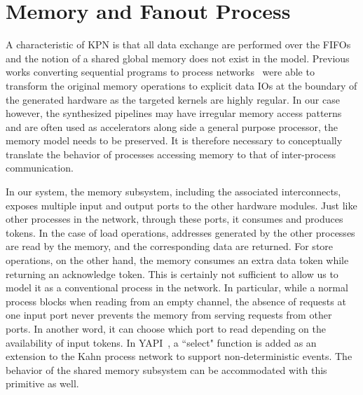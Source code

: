 \section{Memory and Fanout Process}
\label{mp}
A characteristic
of KPN is that all data exchange are performed over the FIFOs and the notion of
a shared global memory does not exist in the model. Previous works
converting sequential programs to process networks~\cite{mat2pn}\cite{c2stream}
were able to transform the original memory operations to explicit data IOs
at the boundary of the generated hardware as the targeted kernels are highly 
regular. In our case however, the synthesized pipelines may have irregular memory access patterns and are often used as accelerators along side a general purpose processor, the memory model needs to be preserved. It is therefore necessary to conceptually
translate the behavior of processes accessing memory to that of inter-process
communication.


In our system, the memory subsystem, including the associated interconnects, exposes multiple
input and output ports to the other hardware modules. 
Just like other processes in the network, through these ports, it consumes and produces tokens. In the case of load operations, addresses generated by the other processes
are read by the memory, and the corresponding data are returned. For store operations, on the other hand, the memory
consumes an extra data token while returning an acknowledge token.
This is certainly not sufficient to allow us to model it as
a conventional process in the network.
In particular, while a normal process blocks when reading from an empty
channel, the absence of requests at one input port never prevents the memory from serving requests from other ports. In another word, it can choose
which port to read depending on the availability of input tokens.
In YAPI~\cite{deKock:2000:YAM:337292.337511}, a ``select" function is added as an extension to the Kahn process network to support non-deterministic events. The behavior of
the shared memory subsystem can be accommodated with this primitive as well. 

